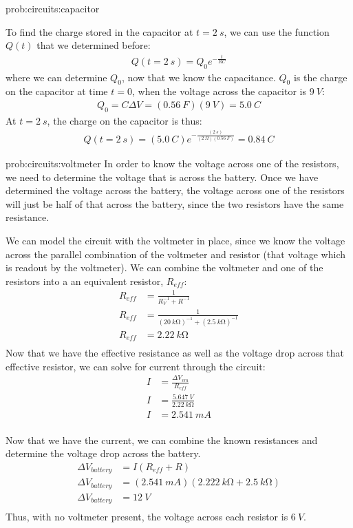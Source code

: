 \begin{solutionParts}{prob:circuits:capacitor}
{\item To find the charge stored in the capacitor at $t = \SI{2}{s}$, we can use the function $Q(t)$ that we determined before:
\begin{align*}
Q(t=\SI{2}{s})=Q_0 e^{-\frac{t}{RC}}
\end{align*}
where we can determine $Q_0$, now that we know the capacitance. $Q_0$ is the charge on the capacitor at time $t=0$, when the voltage across the capacitor is $\SI{9}{V}$:
\begin{align*}
Q_0=C\Delta V = (\SI{0.56}{F})(\SI{9}{V})=\SI{5.0}{C}
\end{align*}
At $t = \SI{2}{s}$, the charge on the capacitor is thus:
\begin{align*}
Q(t = \SI{2}{s})=(\SI{5.0}{C})e^{-\frac{(\SI{2}{s})}{(\SI{2}{\Omega})(\SI{0.56}{F})}}=\SI{0.84}{C}
\end{align*}
}
\end{solutionParts}

\begin{solution}{prob:circuits:voltmeter}\label{soln:circuits:voltmeter} In order to know the voltage across one of the resistors, we need to determine the voltage that is across the battery. Once we have determined the voltage across the battery, the voltage across one of the resistors will just be half of that across the battery, since the two resistors have the same resistance.

We can model the circuit with the voltmeter in place, since we know the voltage across the parallel combination of the voltmeter and resistor (that voltage which is readout by the voltmeter). We can combine the voltmeter and one of the resistors into a an equivalent resistor, $R_{eff}$:
\begin{align*}
R_{eff} &= \frac{1}{R_V^{-1}+R^{-1}}\\
R_{eff} &= \frac{1}{(\SI{20}{k\ohm})^{-1}+(\SI{2.5}{k\ohm})^{-1}}\\
R_{eff} &= \SI{2.22}{k\ohm}\\
\end{align*}
Now that we have the effective resistance as well as the voltage drop across that effective resistor, we can solve for current through the circuit:
\begin{align*}
I &= \frac{\Delta V_{vm}}{R_{eff}}\\
I &= \frac{\SI{5.647}{V}}{\SI{2.22}{k\ohm}}\\
I &= \SI{2.541}{mA}\\
\end{align*}

Now that we have the current, we can combine the known resistances and determine the voltage drop across the battery. 
\begin{align*}
\Delta V_{battery} &= I(R_{eff}+R)\\
\Delta V_{battery} &= (\SI{2.541}{mA})(\SI{2.222}{k\ohm}+\SI{2.5}{k\ohm})\\
\Delta V_{battery} &= \SI{12}{V}\\
\end{align*}
Thus, with no voltmeter present, the voltage across each resistor is $\SI{6}{V}$.
\end{solution}

